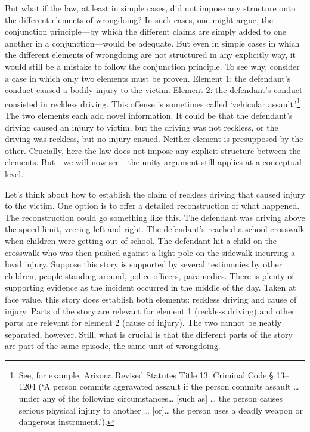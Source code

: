 \documentclass[
  10pt,
  dvipsnames,enabledeprecatedfontcommands]{scrartcl}
\begin{document}
But what if the law, at least in simple cases, did not impose any
structure onto the different elements of wrongdoing? In such cases, one
might argue, the conjunction principle---by which the different claims
are simply added to one another in a conjunction---would be adequate.
But even in simple cases in which the different elements of wrongdoing
are not structured in any explicitly way, it would still be a mistake to
follow the conjunction principle. To see why, consider a case in which
only two elements must be proven. Element 1: the defendant's conduct
caused a bodily injury to the victim. Element 2: the defendant's conduct
consisted in reckless driving. This offense is sometimes called
`vehicular assault.'\footnote{See, for example, Arizona Revised Statutes
  Title 13. Criminal Code § 13--1204 (`A person commits aggravated
  assault if the person commits assault \ldots{} under any of the
  following circumstances\ldots{} {[}such as{]} \ldots{} the person
  causes serious physical injury to another \ldots{} {[}or{]}\ldots{}
  the person uses a deadly weapon or dangerous instrument.').} The two
elements each add novel information. It could be that the defendant's
driving caused an injury to victim, but the driving was not reckless, or
the driving was reckless, but no injury ensued. Neither element is
presupposed by the other. Crucially, here the law does not impose any
explicit structure between the elements. But---we will now see---the
unity argument still applies at a conceptual level.

Let's think about how to establish the claim of reckless driving that
caused injury to the victim. One option is to offer a detailed
reconstruction of what happened. The reconstruction could go something
like this. The defendant was driving above the speed limit, veering left
and right. The defendant's reached a school crosswalk when children were
getting out of school. The defendant hit a child on the crosswalk who
was then pushed against a light pole on the sidewalk incurring a head
injury. Suppose this story is supported by several testimonies by other
children, people standing around, police officers, paramedics. There is
plenty of supporting evidence as the incident occurred in the middle of
the day. Taken at face value, this story does establish both elements:
reckless driving and cause of injury. Parts of the story are relevant
for element 1 (reckless driving) and other parts are relevant for
element 2 (cause of injury). The two cannot be neatly separated,
however. Still, what is crucial is that the different parts of the story
are part of the same episode, the same unit of wrongdoing.
\end{document}
